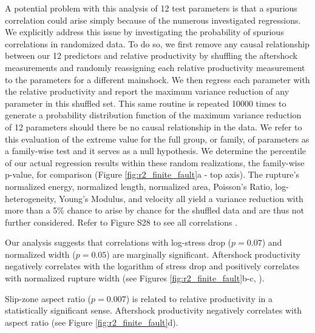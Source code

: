 \documentclass[draft, jgrga]{agujournal2018}
\begin{document}
    A potential problem with this analysis of 12 test parameters is that a spurious correlation could arise simply because of the numerous investigated regressions. We explicitly address this issue by investigating the probability of spurious correlations in randomized data. To do so, we first remove any causal relationship between our 12 predictors and relative productivity by shuffling the aftershock measurements and randomly reassigning each relative productivity measurement to the parameters for a different mainshock. We then regress each parameter with the relative productivity and report the maximum variance reduction of any parameter in this shuffled set. This same routine is repeated 10000 times to generate a probability distribution function of the maximum variance reduction of 12 parameters should there be no causal relationship in the data. We refer to this evaluation of the extreme value for the full group, or family, of parameters as a family-wise test and it serves as a null hypothesis. We determine the percentile of our actual regression results within these random realizations, the family-wise p-value, for comparison (Figure \ref{fig:r2_finite_fault}a - top axis). The rupture's normalized energy, normalized length, normalized area, Poisson's Ratio, log-heterogeneity, Young's Modulus, and velocity all yield a variance reduction with more than a 5\% chance to arise by chance for the shuffled data and are thus not further considered. Refer to Figure S28 to see all correlations \citep{Convers2011GlobalMid2010, Hayes2017}.
    
    Our analysis suggests that correlations with log-stress drop ($p = 0.07$) and normalized width ($p = 0.05$) are mar\-gi\-nally significant. Aftershock productivity negatively correlates with the logarithm of stress drop and positively correlates with normalized rupture width (see Figures \ref{fig:r2_finite_fault}b-c, ).
    
    Slip-zone aspect ratio ($p = 0.007$) is related to relative productivity in a statistically significant sense. Aftershock productivity negatively correlates with aspect ratio (see Figure \ref{fig:r2_finite_fault}d).
    
    
\end{document}
